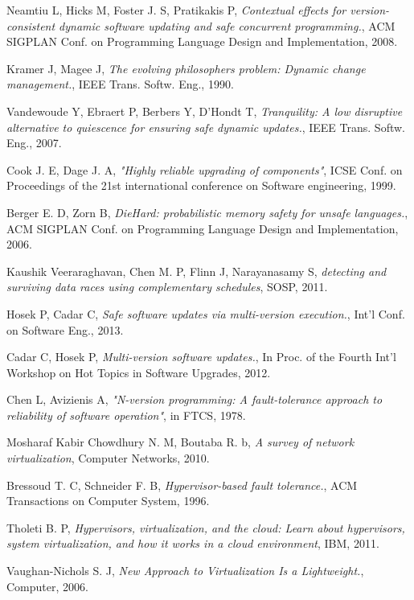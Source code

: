 \documentclass[a4paper,11pt,twoside]{report}
\begin{document}
\begin{thebibliography}{1}
   Neamtiu L, Hicks M, Foster J. S, Pratikakis P, {\em Contextual effects for version-consistent dynamic software updating and safe concurrent programming.}, ACM SIGPLAN Conf. on Programming Language Design and Implementation, 2008. 

   Kramer J, Magee J, {\em The evolving philosophers problem: Dynamic change management.}, IEEE Trans. Softw. Eng., 1990. 

  Vandewoude Y, Ebraert P, Berbers Y, D'Hondt T, {\em Tranquility: A low disruptive alternative to quiescence for ensuring safe dynamic updates.}, IEEE Trans. Softw. Eng., 2007.

  Cook J. E, Dage J. A, {\em "Highly reliable upgrading of components"}, ICSE Conf. on Proceedings of the 21st international conference on Software engineering, 1999.

  Berger E. D, Zorn B, {\em DieHard: probabilistic memory safety for unsafe languages.}, ACM SIGPLAN Conf. on Programming Language Design and Implementation, 2006.
 
  Kaushik Veeraraghavan, Chen M. P, Flinn J, Narayanasamy S, {\em detecting and surviving data races using complementary schedules}, SOSP, 2011. 
 
  Hosek P, Cadar C, {\em Safe software updates via multi-version execution.}, Int'l Conf. on Software Eng., 2013.
 
  Cadar C, Hosek P, {\em Multi-version software updates.}, In Proc. of the Fourth Int'l Workshop on Hot Topics in Software Upgrades, 2012.

 	 Chen L, Avizienis A, {\em  "N-version programming: A fault-tolerance approach to reliability of software operation"}, in FTCS, 1978. 
   
	 Mosharaf Kabir Chowdhury N. M, Boutaba R. b, {\em A survey of network virtualization}, Computer Networks, 2010.
   
	 Bressoud T. C, Schneider F. B, {\em Hypervisor-based fault tolerance.}, ACM 	Transactions on Computer System, 1996.
	   
  	 Tholeti B. P, {\em Hypervisors, virtualization, and the cloud: Learn about hypervisors, system virtualization, and how it works in a cloud environment}, IBM, 2011. 

	  Vaughan-Nichols S. J, {\em New Approach to Virtualization Is a Lightweight.}, Computer, 2006.  
	 

\end{thebibliography}
\end{document}
